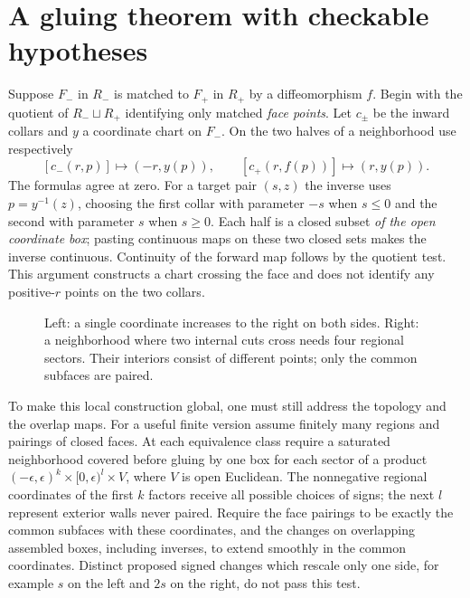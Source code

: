 \section{A gluing theorem with checkable hypotheses}\label{f:glue-space}
Suppose $F_-$ in $R_-$ is matched to $F_+$ in $R_+$ by a diffeomorphism $f$. Begin with the quotient of $R_-\sqcup R_+$ identifying only matched \emph{face points}. Let $c_\pm$ be the inward collars and $y$ a coordinate chart on $F_-$. On the two halves of a neighborhood use respectively
\[
 [c_-(r,p)]\longmapsto(-r,y(p)),\qquad
 [c_+(r,f(p))]\longmapsto(r,y(p)).
\]
The formulas agree at zero. For a target pair $(s,z)$ the inverse uses $p=y^{-1}(z)$, choosing the first collar with parameter $-s$ when $s\le0$ and the second with parameter $s$ when $s\ge0$. Each half is a closed subset \emph{of the open coordinate box}; pasting continuous maps on these two closed sets makes the inverse continuous. Continuity of the forward map follows by the quotient test. This argument constructs a chart crossing the face and does not identify any positive-$r$ points on the two collars.

\begin{figure}[htbp]\centering
{}\caption{Left: a single coordinate increases to the right on both sides. Right: a neighborhood where two internal cuts cross needs four regional sectors. Their interiors consist of different points; only the common subfaces are paired.}\label{f:chart-picture}\end{figure}

To make this local construction global, one must still address the topology and the overlap maps. For a useful finite version assume finitely many regions and pairings of closed faces. At each equivalence class require a saturated neighborhood covered before gluing by one box for each sector of a product $(-\epsilon,\epsilon)^k\times[0,\epsilon)^l\times V$, where $V$ is open Euclidean. The nonnegative regional coordinates of the first $k$ factors receive all possible choices of signs; the next $l$ represent exterior walls never paired. Require the face pairings to be exactly the common subfaces with these coordinates, and the changes on overlapping assembled boxes, including inverses, to extend smoothly in the common coordinates. Distinct proposed signed changes which rescale only one side, for example $s$ on the left and $2s$ on the right, do not pass this test.

